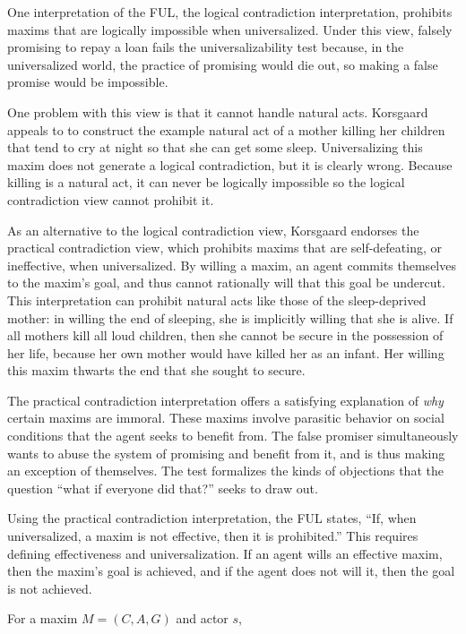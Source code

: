 \begin{isabellebody}
\begin{isamarkuptext}
One interpretation of the FUL, the logical contradiction interpretation, prohibits maxims that are 
logically impossible when universalized. Under this view, falsely promising to repay a loan fails the 
universalizability test because, in the universalized world, the practice of promising would die out, 
so making a false promise would be impossible.

One problem with this view is that it cannot handle natural acts. Korsgaard appeals to 
\citet{dietrichson} to construct the example natural act of a mother killing her children that tend to 
cry at night so that she can get some sleep. Universalizing this maxim does not generate a logical 
contradiction, but it is clearly wrong. Because killing is a natural act, it can never be logically 
impossible so the logical contradiction view cannot prohibit it.

As an alternative to the logical contradiction view, Korsgaard endorses the practical contradiction view, 
which prohibits maxims that are self-defeating, or ineffective, when universalized. By willing a maxim, 
an agent commits themselves to the maxim's goal, and thus cannot rationally will that this goal be 
undercut. This interpretation can prohibit natural acts like those of the sleep-deprived mother: in 
willing the end of sleeping, she is implicitly willing that she is alive. If all mothers kill all 
loud children, then she cannot be secure in the possession of her life, because her own mother would 
have killed her as an infant. Her willing this maxim thwarts the end that she sought to secure. 

The practical contradiction interpretation offers a satisfying explanation of \emph{why} certain 
maxims are immoral. These maxims involve parasitic behavior on social conditions that the agent seeks 
to benefit from. The false promiser simultaneously wants to abuse the system of promising and benefit 
from it, and is thus making an exception of themselves. The test formalizes the kinds of objections 
that the question ``what if everyone did that?'' seeks to draw out.

Using the practical contradiction interpretation, the FUL states, ``If, when universalized, a maxim is 
not effective, then it is prohibited.'' This requires defining effectiveness and universalization. 
If an agent wills an effective maxim, then the maxim's goal is achieved, and if the agent does 
not will it, then the goal is not achieved. 

\begin{definition}
For a maxim $M = (C, A, G)$ and actor $s$,


\end{definition}
\end{isamarkuptext}
\end{isabellebody}
